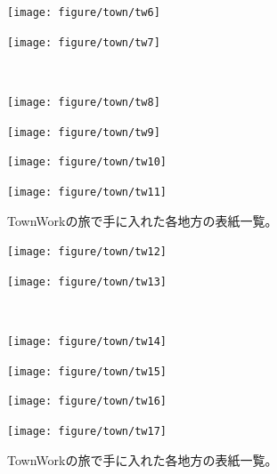\documentclass[12pt]{jsarticle}
\begin{document}
\newpage
\begin{figure}[htbp]
\vspace{-10mm}
    \centering
  \begin{minipage}{0.4\linewidth}
    \centering
    \texttt{[image: figure/town/tw6]}
  \end{minipage}
  \begin{minipage}{0.4\linewidth}
    \centering
    \texttt{[image: figure/town/tw7]}
  \end{minipage}\\
  \begin{minipage}{0.4\linewidth}
    \centering
    \texttt{[image: figure/town/tw8]}
  \end{minipage}
  \begin{minipage}{0.4\linewidth}
    \centering
    \texttt{[image: figure/town/tw9]}
  \end{minipage}
  \begin{minipage}{0.4\linewidth}
    \centering
    \texttt{[image: figure/town/tw10]}
  \end{minipage}
  \begin{minipage}{0.4\linewidth}
    \centering
    \texttt{[image: figure/town/tw11]}
  \end{minipage}
  \caption{TownWorkの旅で手に入れた各地方の表紙一覧。}
  \label{CscDetaDphi-CSide}
\end{figure}

\newpage
\begin{figure}[htbp]
\vspace{-10mm}
    \centering
  \begin{minipage}{0.4\linewidth}
    \centering
    \texttt{[image: figure/town/tw12]}
  \end{minipage}
  \begin{minipage}{0.4\linewidth}
    \centering
    \texttt{[image: figure/town/tw13]}
  \end{minipage}\\
  \begin{minipage}{0.4\linewidth}
    \centering
    \texttt{[image: figure/town/tw14]}
  \end{minipage}
  \begin{minipage}{0.4\linewidth}
    \centering
    \texttt{[image: figure/town/tw15]}
  \end{minipage}
  \begin{minipage}{0.4\linewidth}
    \centering
    \texttt{[image: figure/town/tw16]}
  \end{minipage}
  \begin{minipage}{0.4\linewidth}
    \centering
    \texttt{[image: figure/town/tw17]}
  \end{minipage}
  \caption{TownWorkの旅で手に入れた各地方の表紙一覧。}
  \label{CscDetaDphi-CSide}
\end{figure}
\end{document}
